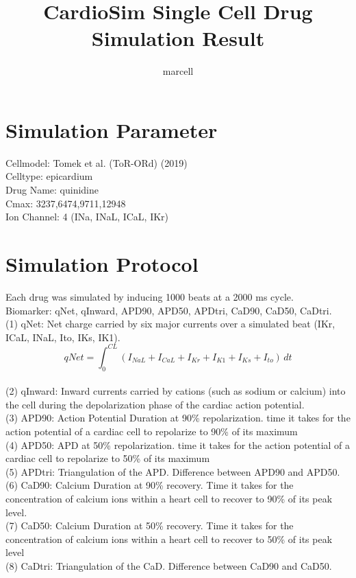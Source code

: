 \documentclass[11pt]{article}
\title{CardioSim Single Cell Drug Simulation Result}
\author{marcell}
\begin{document}
\maketitle
\section*{Simulation Parameter}
Cellmodel: Tomek et al. (ToR-ORd) (2019)
\\Celltype: epicardium
\\Drug Name: quinidine
\\Cmax: 3237,6474,9711,12948
\\Ion Channel: 4 (INa, INaL, ICaL, IKr)
\section*{Simulation Protocol}
Each drug was simulated by inducing 1000 beats at a 2000 ms cycle.
\\Biomarker: qNet, qInward, APD90, APD50, APDtri, CaD90, CaD50, CaDtri.
\\(1) qNet: Net charge carried by six major currents over a simulated beat (IKr, ICaL, INaL, Ito, IKs, IK1).
\begin{equation}
	 qNet = \int_{0}^{CL} (I_{NaL} + I_{CaL} + I_{Kr} + I_{K1} + I_{Ks} + I_{to}) \,dt
	 \label{qnet}
\end{equation}
\\(2) qInward: Inward currents carried by cations (such as sodium or calcium) into the cell during the depolarization phase of the cardiac action potential.
\\(3) APD90: Action Potential Duration at 90\% repolarization. time it takes for the action potential of a cardiac cell to repolarize to 90\% of its maximum
\\(4) APD50: APD at 50\% repolarization. time it takes for the action potential of a cardiac cell to repolarize to 50\% of its maximum
\\(5)  APDtri: Triangulation of the APD. Difference between APD90 and APD50. 
\\(6)  CaD90: Calcium Duration at 90\% recovery. Time it takes for the concentration of calcium ions within a heart cell to recover to 90\% of its peak level.
\\(7)  CaD50: Calcium Duration at 50\% recovery. Time it takes for the concentration of calcium ions within a heart cell to recover to 50\% of its peak level
\\(8)  CaDtri: Triangulation of the CaD. Difference between CaD90 and CaD50.
\end{document}

